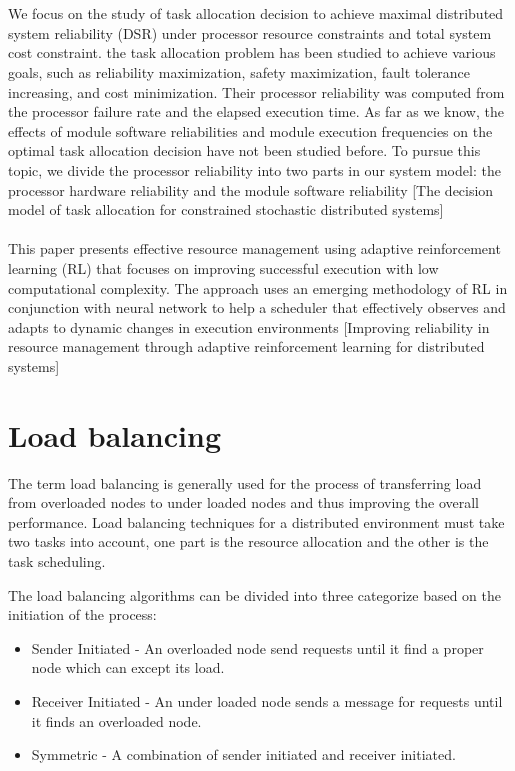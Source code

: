 \documentclass{cslthse-msc}
\begin{document}
\\\\
We focus on the study of task allocation decision to achieve maximal distributed system reliability (DSR) under processor resource constraints and total system cost constraint. the task allocation problem has been studied to achieve various goals, such as reliability maximization, safety maximization, fault tolerance increasing, and cost minimization. Their processor reliability was computed from the processor failure rate and the elapsed execution time. As far as we know, the effects of module software reliabilities and module execution frequencies on the optimal task allocation decision have not been studied before. To pursue this topic, we divide the processor reliability into two parts in our system model: the processor hardware reliability and the module software reliability [The decision model of task allocation for constrained stochastic distributed systems]
\\\\
This paper presents effective resource management using adaptive reinforcement learning (RL) that focuses on improving successful execution with low computational complexity. The approach uses an emerging methodology of RL in conjunction with neural network to help a scheduler that effectively observes and adapts to dynamic changes in execution environments [Improving reliability in resource management through adaptive reinforcement learning for distributed systems]


\section{Load balancing}
The term load balancing is generally used for the process of transferring load from overloaded nodes to under loaded nodes and thus improving the overall performance. Load balancing techniques for a distributed environment must take two tasks into account, one part is the resource allocation and the other is the task scheduling. 

The load balancing algorithms can be divided into three categorize based on the initiation of the process:
\begin{itemize}
\item Sender Initiated - An overloaded node send requests until it find a proper node which can except its load.
\item Receiver Initiated - An under loaded node sends a message for requests until it finds an overloaded node.
\item Symmetric - A combination of sender initiated and receiver initiated. 
\end{itemize}
\end{document}
